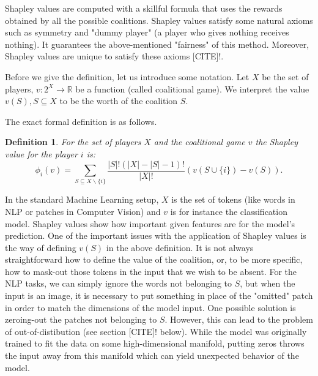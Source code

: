 \documentclass[magisterska,en]{pracamgr}
\newtheorem{defi}{Definition}[section]
\begin{document}
Shapley values are computed with a skillful formula that uses the rewards obtained by all the possible coalitions.
Shapley values satisfy some natural axioms such as symmetry and "dummy player" (a player who gives nothing receives nothing).
It guarantees the above-mentioned "fairness" of this method. Moreover, Shapley values are unique to satisfy these axioms [CITE]!. 

Before we give the definition, let us introduce some notation. Let $X$ be the set of players, $v: 2^X \rightarrow \mathbb{R}$ be a function (called coalitional game). We interpret the value $v(S), S \subseteq X$ to be the worth of the coalition $S$.

The exact formal definition is as follows.

\begin{defi}\label{shap_def}
  For the set of players $X$ and the coalitional game $v$ the Shapley value for the player $i$ is:
  \begin{equation*}
      \phi_i(v) = \sum_{S\subseteq X\backslash \{i\}} \frac{|S|!(|X|-|S|-1)!}{|X|!}\left(v(S \cup \{i\}) - v(S)\right).
  \end{equation*}
\end{defi}

In the standard Machine Learning setup, $X$ is the set of tokens (like words in NLP or patches in Computer Vision) and $v$ is for instance the classification model. Shapley values show how important given features are for the model's prediction. One of the important issues with the application of Shapley values is the way of defining $v(S)$ in the above definition. It is not always straightforward how to define the value of the coalition, or, to be more specific, how to mask-out those tokens in the input that we wish to be absent. For the NLP tasks, we can simply ignore the words not belonging to $S$, but when the input is an image, it is necessary to put something in place of the "omitted" patch in order to match the dimensions of the model input. One possible solution is zeroing-out the patches not belonging to $S$. However, this can lead to the problem of out-of-distibution (see section [CITE]! below). While the model was originally trained to fit the data on some high-dimensional manifold, putting zeros throws the input away from this manifold which can yield unexpected behavior of the model.
\end{document}
